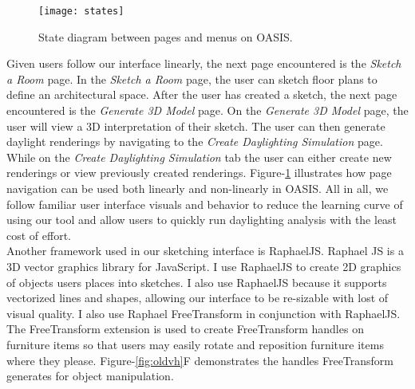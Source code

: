 		\begin{figure}[h]
		\centering
		\texttt{[image: states]}
		\caption{State diagram between pages and menus on OASIS.}
		\label{fig:states}
		\end{figure}

		Given users follow our interface linearly, the next page encountered is the \textit{Sketch a Room} page. 
		In the \textit{Sketch a Room} page, the user can sketch floor plans to define an architectural space.
		After the user has created a sketch, the next page encountered is the \textit{Generate 3D Model} page. 
		On the \textit{Generate 3D Model} page, the user will view a 3D interpretation of their sketch. 
		The user can then generate daylight renderings by navigating to the \textit{Create Daylighting Simulation} page.
		While on the \textit{Create Daylighting Simulation} tab the user can either create new renderings or view previously created renderings.
		Figure-\ref{fig:states} illustrates how page navigation can be used both linearly and non-linearly in OASIS.
		All in all, we follow familiar user interface visuals and behavior to reduce the learning curve of using our tool and allow users to quickly run daylighting analysis with the least cost of effort.\\

		Another framework used in our sketching interface is RaphaelJS\cite{}.
		Raphael JS is a 3D vector graphics library for JavaScript. 
		I use RaphaelJS to create 2D graphics of objects users places into sketches. I also use RaphaelJS because it supports vectorized lines and shapes, allowing our interface  to be re-sizable with lost of visual quality.
		I also use Raphael FreeTransform in conjunction with RaphaelJS\cite{}. 
		The FreeTransform extension is used to create FreeTransform handles on furniture items so that users may easily rotate and reposition furniture items where they please.
		Figure-\ref{fig:oldvh}F demonstrates the handles FreeTransform generates for object manipulation.\\


